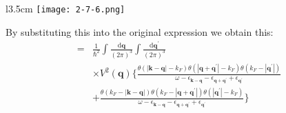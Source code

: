 \begin{wrapfigure}[4]{l}{3.5cm}
\label{Fig2.7.6} \texttt{[image: 2-7-6.png]}
\end{wrapfigure}

By substituting this into the original expression we obtain this:
\begin{equation} \label{Eqs2.7.1} \begin{split}
= & \frac{1}{\hbar^2} \int \frac{\mathrm{d}\mathbf{q}}{\left( 2\pi \right)^3} \int \frac{\mathrm{d}\mathbf{q}^{'}}{\left( 2\pi \right)^3} \\
& \times V^2(\mathbf{q}) \{
\frac{\theta(|\mathbf{k}-\mathbf{q}|-k_F)\theta(|\mathbf{q}+\mathbf{q}^{'}|-k_F)\theta(k_F-|\mathbf{q}^{'}|)}{\omega - \epsilon_{\mathbf{k}-\mathbf{q}}-\epsilon_{\mathbf{q}+\mathbf{q}^{'}}+\epsilon_{\mathbf{q}^{'}}}
\\
&+\frac{\theta(k_F-|\mathbf{k}-\mathbf{q}|)\theta(k_F-|\mathbf{q}+\mathbf{q}^{'}|)\theta(|\mathbf{q}^{'}|-k_F)}{\omega - \epsilon_{\mathbf{k}-\mathbf{q}}-\epsilon_{\mathbf{q}+\mathbf{q}^{'}}+\epsilon_{\mathbf{q}^{'}}}
\} \end{split}\end{equation}

